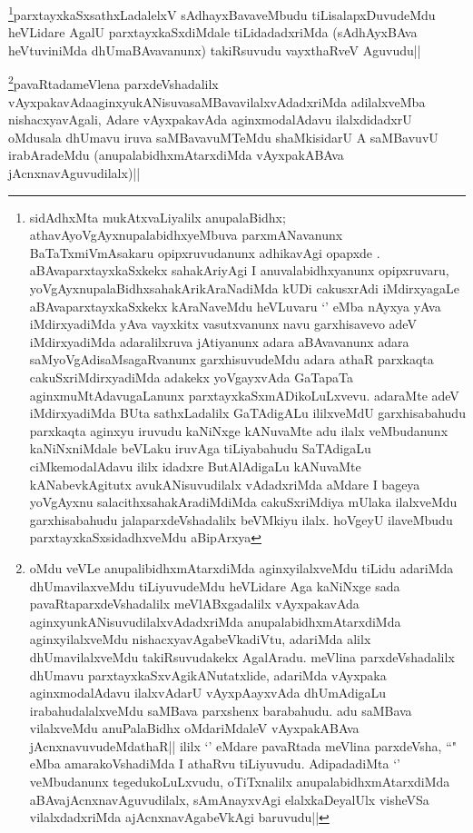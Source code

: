 \begin{artha}
\footnote{sidAdhxMta mukAtxvaLiyalilx anupalaBidhx; athavAyoVgAyxnupalabidhxyeMbuva parxmANavanunx BaTaTxmiVmAsakaru opipxruvudanunx adhikavAgi opapxde . aBAvaparxtayxkaSxkekx sahakAriyAgi I anuvalabidhxyanunx opipxruvaru, yoVgAyxnupalaBidhxsahakArikAraNadiMda kUDi cakusxrAdi iMdirxyagaLe aBAvaparxtayxkaSxkekx  kAraNaveMdu heVLuvaru `\stext' eMba nAyxya yAva iMdirxyadiMda yAva vayxkitx vasutxvanunx navu garxhisavevo adeV iMdirxyadiMda adaralilxruva jAtiyanunx adara aBAvavanunx adara saMyoVgAdisaMsagaRvanunx garxhisuvudeMdu adara athaR parxkaqta cakuSxriMdirxyadiMda adakekx yoVgayxvAda GaTapaTa aginxmuMtAdavugaLanunx parxtayxkaSxmADikoLuLxvevu. adaraMte adeV iMdirxyadiMda BUta sathxLadalilx GaTAdigALu ililxveMdU garxhisabahudu parxkaqta aginxyu iruvudu kaNiNxge kANuvaMte adu ilalx veMbudanunx kaNiNxniMdale beVLaku iruvAga tiLiyabahudu  SaTAdigaLu ciMkemodalAdavu ililx idadxre ButAlAdigaLu kANuvaMte kANabevkAgitutx avukANisuvudilalx vAdadxriMda aMdare I bageya yoVgAyxnu salacithxsahakAradiMdiMda cakuSxriMdiya mUlaka ilalxveMdu garxhisabahudu jalaparxdeVshadalilx beVMkiyu ilalx. hoVgeyU ilaveMbudu parxtayxkaSxsidadhxveMdu aBipArxya}parxtayxkaSxsathxLadalelxV sAdhayxBavaveMbudu tiLisalapxDuvudeMdu heVLidare AgalU parxtayxkaSxdiMdale tiLidadadxriMda (sAdhAyxBAva heVtuviniMda dhUmaBAvavanunx) takiRsuvudu vayxthaRveV Aguvudu||
\end{artha}

\begin{artha}
\footnote{oMdu veVLe anupalibidhxmAtarxdiMda aginxyilalxveMdu tiLidu adariMda dhUmavilaxveMdu tiLiyuvudeMdu heVLidare Aga kaNiNxge sada pavaRtaparxdeVshadalilx meVlABxgadalilx vAyxpakavAda aginxyunkANisuvudilalxvAdadxriMda anupalabidhxmAtarxdiMda aginxyilalxveMdu nishacxyavAgabeVkadiVtu, adariMda alilx dhUmavilalxveMdu takiRsuvudakekx AgalAradu.  meVlina parxdeVshadalilx dhUmavu parxtayxkaSxvAgikANutatxlide,  adariMda vAyxpaka aginxmodalAdavu ilalxvAdarU vAyxpAayxvAda dhUmAdigaLu irabahudalalxveMdu saMBava parxshenx barabahudu. adu saMBava vilalxveMdu anuPalaBidhx oMdariMdaleV vAyxpakABAva jAcnxnavuvudeMdathaR|| ililx `\stext' eMdare pavaRtada meVlina parxdeVsha, ``\stext" eMba amarakoVshadiMda I athaRvu tiLiyuvudu. AdipadadiMta `\stext' veMbudanunx tegedukoLuLxvudu, oTiTxnalilx anupalabidhxmAtarxdiMda aBAvajAcnxnavAguvudilalx, sAmAnayxvAgi elalxkaDeyalUlx visheVSa vilalxdadxriMda ajAcnxnavAgabeVkAgi baruvudu||}pavaRtadameVlena parxdeVshadalilx vAyxpakavAdaaginxyukANisuvasaMBavavilalxvAdadxriMda adilalxveMba nishacxyavAgali, Adare vAyxpakavAda aginxmodalAdavu ilalxdidadxrU oMdusala dhUmavu iruva saMBavavuMTeMdu shaMkisidarU A saMBavuvU irabAradeMdu (anupalabidhxmAtarxdiMda vAyxpakABAva jAcnxnavAguvudilalx)||
\end{artha}

